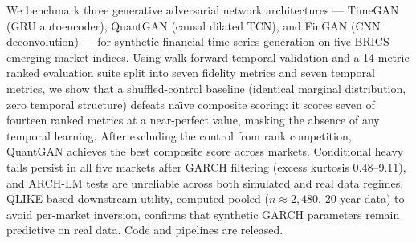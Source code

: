 \documentclass[10pt]{article}
\begin{document}
\begin{tcolorbox}[enhanced,arc=4pt,boxrule=1pt,colframe=Navy,colback=LBg,
  top=6pt,bottom=6pt,left=8pt,right=8pt,before skip=2pt,after skip=8pt,
  title={\bfseries Abstract --- $\leq$150 words, unreferenced}]
\small
We benchmark three generative adversarial network architectures --- TimeGAN (GRU autoencoder), QuantGAN (causal dilated TCN), and FinGAN (CNN deconvolution) --- for synthetic financial time series generation on five BRICS emerging-market indices. Using walk-forward temporal validation and a 14-metric ranked evaluation suite split into seven fidelity metrics and seven temporal metrics, we show that a shuffled-control baseline (identical marginal distribution, zero temporal structure) defeats na\"{\i}ve composite scoring: it scores seven of fourteen ranked metrics at a near-perfect value, masking the absence of any temporal learning. After excluding the control from rank competition, QuantGAN achieves the best composite score across markets. Conditional heavy tails persist in all five markets after GARCH filtering (excess kurtosis 0.48--9.11), and ARCH-LM tests are unreliable across both simulated and real data regimes. QLIKE-based downstream utility, computed pooled ($n\approx2{,}480$, 20-year data) to avoid per-market inversion, confirms that synthetic GARCH parameters remain predictive on real data. Code and pipelines are released.
\end{tcolorbox}
\end{document}
